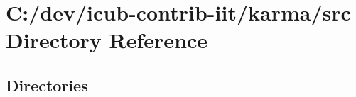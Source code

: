 \section{C\+:/dev/icub-\/contrib-\/iit/karma/src Directory Reference}
\label{dir_68267d1309a1af8e8297ef4c3efbcdba}
\subsection*{Directories}
\begin{DoxyCompactItemize}
\end{DoxyCompactItemize}
